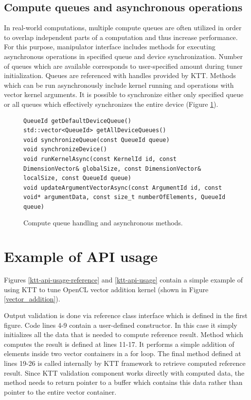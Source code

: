 \documentclass
[
    digital, %
    oneside, %
    table, %
    nolof, %
    nolot, %
    nocover %
]{fithesis3}
\begin{document}
\subsection{Compute queues and asynchronous operations}
In real-world computations, multiple compute queues are often utilized in order to overlap independent parts of a computation and thus increase
performance. For this purpose, manipulator interface includes methods for executing asynchronous operations in specified queue and device synchronization.
Number of queues which are available corresponds to user-specified amount during tuner initialization. Queues are referenced with handles provided by KTT.
Methods which can be run asynchronously include kernel running and operations with vector kernel arguments. It is possible to synchronize either only
specified queue or all queues which effectively synchronizes the entire device (Figure \ref{ktt-manipulator-asynchronous-methods}).

\begin{figure}
\begin{adjustwidth}{-1cm}{-1cm}
\begin{lstlisting}
QueueId getDefaultDeviceQueue()
std::vector<QueueId> getAllDeviceQueues()
void synchronizeQueue(const QueueId queue)
void synchronizeDevice()
void runKernelAsync(const KernelId id, const DimensionVector& globalSize, const DimensionVector& localSize, const QueueId queue)
void updateArgumentVectorAsync(const ArgumentId id, const void* argumentData, const size_t numberOfElements, QueueId queue)
\end{lstlisting}
\caption{Compute queue handling and asynchronous methods.}
\label{ktt-manipulator-asynchronous-methods}
\end{adjustwidth}
\end{figure}

\section{Example of API usage}
Figures \ref{ktt-api-usage-reference} and \ref{ktt-api-usage} contain a simple example of using KTT to tune OpenCL vector addition kernel (shown in
Figure \ref{vector_addition}).

Output validation is done via reference class interface which is defined in the first figure. Code lines 4-9 contain a user-defined constructor. In this
case it simply initializes all the data that is needed to compute reference result. Method which computes the result is defined at lines 11-17. It
performs a simple addition of elements inside two vector containers in a for loop. The final method defined at lines 19-26 is called internally by KTT
framework to retrieve computed reference result. Since KTT validation component works directly with computed data, the method needs to return pointer
to a buffer which contains this data rather than pointer to the entire vector container.
\end{document}
